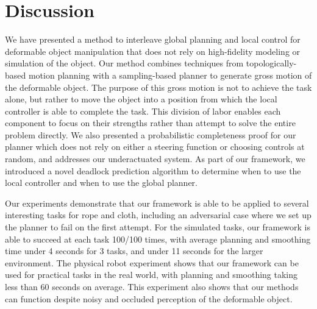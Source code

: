

\FloatBarrier



\FloatBarrier



\FloatBarrier



\FloatBarrier


\section{Discussion}
\label{sec:planning_discussion}

We have presented a method to interleave global planning and local control for deformable object manipulation that does not rely on high-fidelity modeling or simulation of the object. Our method combines techniques from topologically-based motion planning with a sampling-based planner to generate gross motion of the deformable object. The purpose of this gross motion is not to achieve the task alone, but rather to move the object into a position from which the local controller is able to complete the task. This division of labor enables each component to focus on their strengths rather than attempt to solve the entire problem directly. We also presented a probabilistic completeness proof for our planner which does not rely on either a steering function or choosing controls at random, and addresses our underactuated system. As part of our framework, we introduced a novel deadlock prediction algorithm to determine when to use the local controller and when to use the global planner.

Our experiments demonstrate that our framework is able to be applied to several interesting tasks for rope and cloth, including an adversarial case where we set up the planner to fail on the first attempt. For the simulated tasks, our framework is able to succeed at each task 100/100 times, with average planning and smoothing time under 4 seconds for 3 tasks, and under 11 seconds for the larger environment. The physical robot experiment shows that our framework can be used for practical tasks in the real world, with planning and smoothing taking less than 60 seconds on average. This experiment also shows that our methods can function despite noisy and occluded perception of the deformable object.

